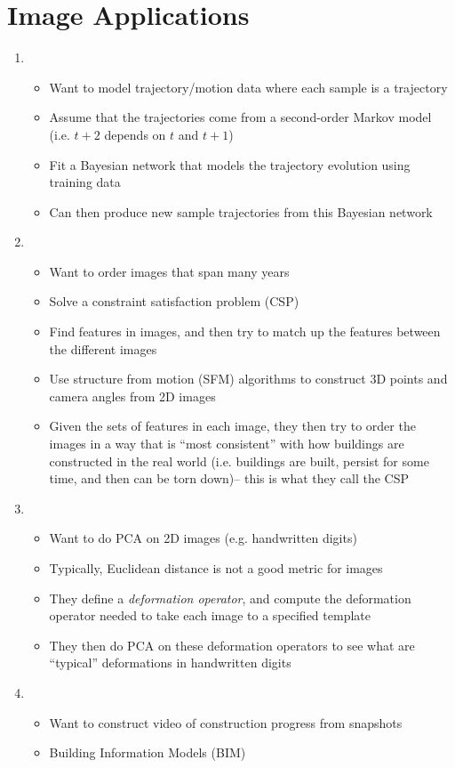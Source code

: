 \documentclass[12pt]{article}
\begin{document}
\section{Image Applications}

\begin{enumerate}

\item {}
\begin{itemize}
	\item Want to model trajectory/motion data where each sample is a trajectory
	\item Assume that the trajectories come from a second-order Markov model (i.e. $t+2$ depends on $t$ and $t+1$)
	\item Fit a Bayesian network that models the trajectory evolution using training data
	\item Can then produce new sample trajectories from this Bayesian network
\end{itemize}

\item {}
\begin{itemize}
	\item Want to order images that span many years
	\item Solve a constraint satisfaction problem (CSP)
	\item Find features in images, and then try to match up the features between the different images
	\item Use structure from motion (SFM) algorithms to construct 3D points and camera angles from 2D images
	\item Given the sets of features in each image, they then try to order the images in a way that is ``most consistent'' with how buildings are constructed in the real world (i.e. buildings are built, persist for some time, and then can be torn down)-- this is what they call the CSP
\end{itemize}

\item {}
\begin{itemize}
	\item Want to do PCA on 2D images (e.g. handwritten digits)
	\item Typically, Euclidean distance is not a good metric for images
	\item They define a {\em deformation operator}, and compute the deformation operator needed to take each image to a specified template
	\item They then do PCA on these deformation operators to see what are ``typical'' deformations in handwritten digits
\end{itemize}

\item {}
\begin{itemize}
	\item Want to construct video of construction progress from snapshots
	\item Building Information Models (BIM) 
\end{itemize}

\end{enumerate}
\end{document}
